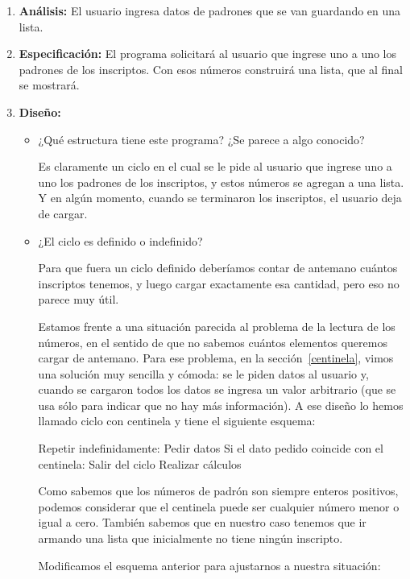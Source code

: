 \begin{enumerate}

\item {\bf Análisis:} El usuario ingresa datos de padrones que se van
guardando en una lista.

\item {\bf Especificación:} El programa solicitará al usuario que ingrese
uno a uno los padrones de los inscriptos. Con esos números construirá una
lista, que al final se mostrará.

\item {\bf Diseño:}
\begin{itemize}
\item ¿Qué estructura tiene este programa? ¿Se parece a algo conocido?

Es claramente un ciclo en el cual se le pide al usuario que ingrese uno a
uno los padrones de los inscriptos, y estos números se agregan a una lista.
Y en algún momento, cuando se terminaron los inscriptos, el usuario deja de
cargar.

\item ¿El ciclo es definido o indefinido?

Para que fuera un ciclo definido deberíamos contar de antemano cuántos
inscriptos tenemos, y luego cargar exactamente esa cantidad, pero eso no
parece muy útil.

Estamos frente a una situación parecida al problema de la lectura de los
números, en el sentido de que no sabemos cuántos elementos queremos cargar
de antemano. Para ese problema, en la sección~\ref{centinela}, vimos una solución muy
sencilla y cómoda: se le piden datos al usuario y, cuando se cargaron todos
los datos se ingresa un valor arbitrario (que se usa sólo para indicar que
no hay más información). A ese diseño lo hemos llamado ciclo con centinela
y tiene el siguiente esquema:

\begin{codigo-nohl-sn}
Repetir indefinidamente:
    Pedir datos
    Si el dato pedido coincide con el centinela:
        Salir del ciclo
	Realizar cálculos
\end{codigo-nohl-sn}

Como sabemos que los números de padrón son siempre enteros positivos,
podemos considerar que el centinela puede ser cualquier número menor o
igual a cero.  También sabemos que en nuestro caso tenemos que ir armando
una lista que inicialmente no tiene ningún inscripto.

Modificamos el esquema anterior para ajustarnos a nuestra situación:


\end{itemize}
\end{enumerate}
